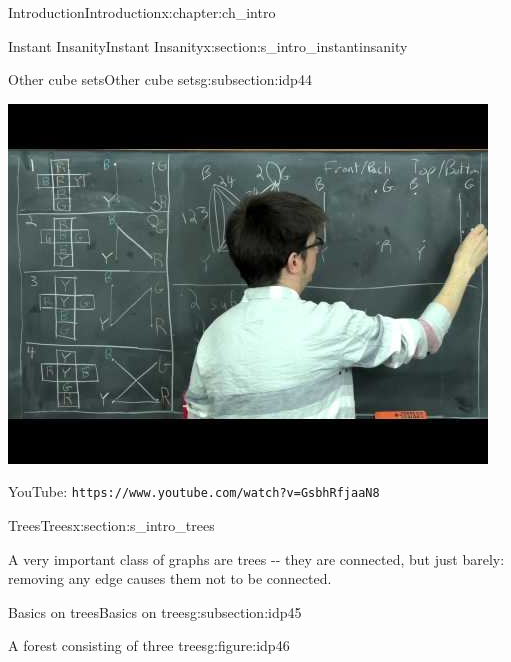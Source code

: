 \documentclass[oneside,10pt,]{book}
\newcommand{\mono}[1]{\texttt{#1}}
\numberwithin{equation}{section}
\newlength{\qrsize}
\newlength{\previewwidth}
\begin{document}
\begin{chapterptx}{Introduction}{}{Introduction}{}{}{x:chapter:ch_intro}
\begin{sectionptx}{Instant Insanity}{}{Instant Insanity}{}{}{x:section:s_intro_instantinsanity}
\begin{subsectionptx}{Other cube sets}{}{Other cube sets}{}{}{g:subsection:idp44}
\begin{tcbraster}[raster columns=2, raster column skip=1pt, raster halign=center, raster force size=false, raster left skip=0pt, raster right skip=0pt]
\begin{tcolorbox}[previewstyle, width=\previewwidth]%
\includegraphics[width=0.80\linewidth,height=\qrsize,keepaspectratio]{images/video-1.jpg}%
\end{tcolorbox}%
\begin{tcolorbox}[qrstyle]%
{\hypersetup{urlcolor=black}}%
\end{tcolorbox}%
\begin{tcolorbox}[captionstyle]%
\small YouTube: \mono{https://www.youtube.com/watch?v=GsbhRfjaaN8}\end{tcolorbox}%
\end{tcbraster}%
\end{subsectionptx}
\end{sectionptx}
%
%
\typeout{************************************************}
\typeout{************************************************}
%
\begin{sectionptx}{Trees}{}{Trees}{}{}{x:section:s_intro_trees}
\begin{introduction}{}%
A very important class of graphs are trees -{}-{} they are connected, but just barely: removing any edge causes them not to be connected.%
\end{introduction}%
%
%
\typeout{************************************************}
\typeout{************************************************}
%
\begin{subsectionptx}{Basics on trees}{}{Basics on trees}{}{}{g:subsection:idp45}
\begin{figureptx}{A forest consisting of three trees}{g:figure:idp46}{}%
\begin{image}{0.1}{0.8}{0.1}%

\end{image}
\end{figureptx}
\end{subsectionptx}
\end{sectionptx}
\end{chapterptx}
\end{document}
